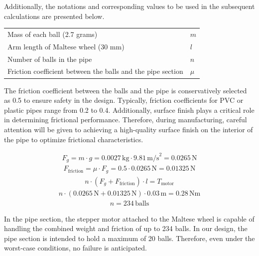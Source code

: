 \documentclass[12pt]{report}
\begin{document}
Additionally, the notations and corresponding values to be used in the subsequent calculations are presented below.


\begin{table}[h!]
\centering
\label{tab:system_parameters}
\begin{tabular}{ll} 
Mass of each ball (2.7 grams)  & $m$  \\ 
Arm length of Maltese wheel (30 mm) & $l$ \\ 
Number of balls in the pipe & $n$ \\ 
Friction coefficient between the balls and the pipe section  & $\mu$  \\ 
\end{tabular}
\end{table}



The friction coefficient between the balls and the pipe is conservatively selected as 0.5 to ensure safety in the design. Typically, friction coefficients for PVC or plastic pipes range from 0.2 to 0.4. Additionally, surface finish plays a critical role in determining frictional performance. Therefore, during manufacturing, careful attention will be given to achieving a high-quality surface finish on the interior of the pipe to optimize frictional characteristics.

\begin{align}
F_g = m \cdot g = 0.0027 \, \text{kg} \cdot 9.81 \, \text{m/s}^2 = 0.0265 \, \text{N}
\end{align}
\begin{align}
F_{\text{friction}} = \mu \cdot F_g = 0.5 \cdot 0.0265 \, \text{N} = 0.01325 \, \text{N}
\end{align}
\begin{align}
n \cdot (F_g + F_{\text{friction}}) \cdot l = T_{\text{motor}}
\end{align}
\begin{align}
n \cdot (0.0265 \, \text{N} + 0.01325 \, \text{N}) \cdot 0.03 \, \text{m} = 0.28 \, \text{Nm}
\end{align}
\begin{align}
n = 234 \, \text{balls}
\end{align}

In the pipe section, the stepper motor attached to the Maltese wheel is capable of handling the combined weight and friction of up to 234 balls.
 In our design, the pipe section is intended to hold a maximum of 20 balls. Therefore, even under the worst-case conditions, no failure is anticipated.
 
\end{document}
